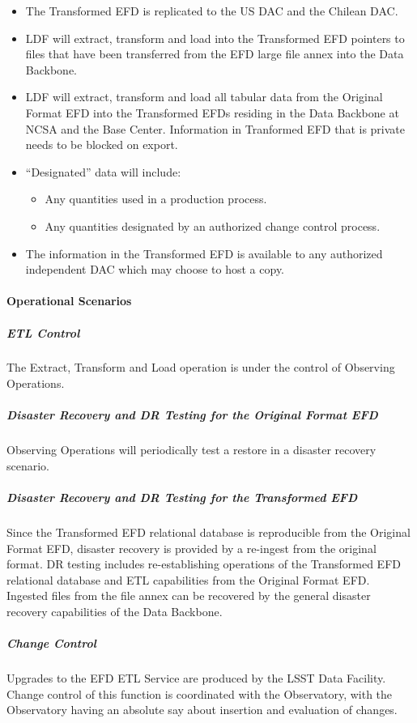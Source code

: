 \begin{itemize}
\item The Transformed EFD is replicated to the US DAC and the Chilean DAC.
\item LDF will extract, transform and load into the Transformed EFD pointers to files
that have been transferred from the EFD large file annex into the Data Backbone.
\item LDF will extract, transform and load all tabular data from the
Original Format EFD into the Transformed EFDs residing in the Data Backbone at
NCSA and the Base Center. Information in Tranformed EFD that is private needs to be blocked on export.  
\item “Designated” data will include:
  \begin{itemize}
  \item Any quantities used in a production process.
  \item Any quantities designated by an authorized change control process.
  \end{itemize}
\item The information in the Transformed EFD is available to any authorized independent
DAC which may choose to host a copy.
\end{itemize}

\paragraph{Operational Scenarios}

\subparagraph{ETL Control}

The Extract, Transform and Load operation is under the control of Observing Operations.

\subparagraph{Disaster Recovery and DR Testing for the Original Format EFD}

Observing Operations will periodically test a restore in a disaster recovery scenario.

\subparagraph{Disaster Recovery and DR Testing for the Transformed EFD}

Since the Transformed EFD relational database is reproducible from the
Original Format EFD, disaster recovery is provided by a re-ingest from the
original format. DR testing includes re-establishing operations of the Transformed
EFD relational database and ETL capabilities from the Original Format EFD. Ingested
files from the file annex can be recovered by the general disaster recovery capabilities
of the Data Backbone.

\subparagraph{Change Control}

Upgrades to the EFD ETL Service are produced by the LSST Data Facility.
Change control of this function is coordinated with the Observatory, with the
Observatory having an absolute say about insertion and evaluation of changes.
